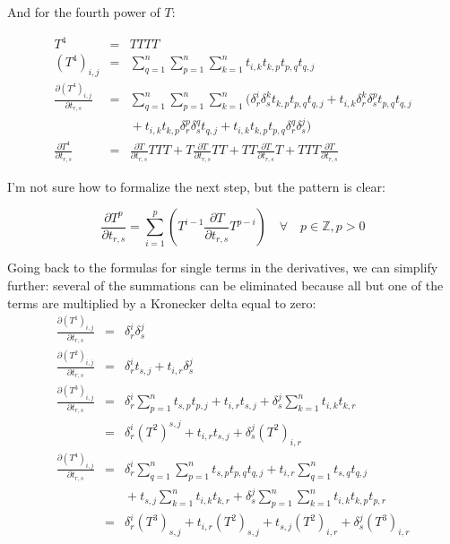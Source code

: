 \documentclass{report}
\begin{document}
And for the fourth power of $T$:

\begin{eqnarray}
T^4 &=& T T T T\\
(T^4)_{i,j} &=& \sum_{q=1}^n \sum_{p=1}^n \sum_{k=1}^n t_{i,k} t_{k,p} t_{p,q} t_{q,j} \\
\nonumber 
\frac{\partial (T^4)_{i,j}}{\partial t_{r,s}} &=& 
  \sum_{q=1}^n \sum_{p=1}^n \sum_{k=1}^n ( 
   \delta^i_r \delta^k_s t_{k,p} t_{p,q} t_{q,j} 
   + t_{i,k} \delta^k_r \delta^p_s t_{p,q} t_{q,j} \\ & & {} 
   + t_{i,k} t_{k,p} \delta^p_r \delta^q_s t_{q,j} 
   + t_{i,k} t_{k,p} t_{p,q} \delta^q_r \delta^j_s)\\
\frac{\partial T^4}{\partial t_{r,s}} &=& 
  \frac{\partial T}{\partial t_{r,s}} T T T 
  + T \frac{\partial T}{\partial t_{r,s}} T T 
  + T T \frac{\partial T}{\partial t_{r,s}} T 
  + T T T \frac{\partial T}{\partial t_{r,s}}
\end{eqnarray}

I'm not sure how to formalize the next step, but the pattern is clear:

\begin{equation}
\frac{\partial T^p}{\partial t_{r,s}}
 = \sum_{i=1}^p\left( T^{i-1} \frac{\partial T}{\partial t_{r,s}} T^{p-i} 
   \right) \quad \forall \quad p \in \mathbb{Z}, p > 0
\end{equation}

Going back to the formulas for single terms in the derivatives, we can simplify further: several of the summations can be eliminated because all but one 
of the terms are multiplied by a Kronecker delta equal to zero:
\begin{eqnarray}
\frac{\partial (T^1)_{i,j}}{\partial t_{r,s}} &=& \delta^i_r \delta^j_s \\
\frac{\partial (T^2)_{i,j}}{\partial t_{r,s}} &=& \delta^i_r t_{s,j} + t_{i,r} \delta^j_s \\
\frac{\partial (T^3)_{i,j}}{\partial t_{r,s}} &=& 
\delta_r^i \sum_{p=1}^n t_{s,p} t_{p,j} + t_{i,r} t_{s,j} + 
\delta_s^j \sum_{k=1}^n t_{i,k} t_{k,r} \\
 & = & \delta_r^i (T^2)^{s,j} + t_{i,r} t_{s,j}
 + \delta_s^j (T^2)_{i,r} \\
\nonumber
\frac{\partial (T^4)_{i,j}}{\partial t_{r,s}} &=& 
\delta^i_r \sum_{q=1}^n \sum_{p=1}^n t_{s,p} t_{p,q} t_{q,j} +
t_{i,r} \sum_{q=1}^n t_{s,q} t_{q,j} \\ & & {} +
t_{s,j} \sum_{k=1}^n t_{i,k} t_{k,r} +
\delta^j_s \sum_{p=1}^n \sum_{k=1}^n t_{i,k} t_{k,p} t_{p,r} \\
 & = & \delta^i_r (T^3)_{s,j} +
t_{i,r} (T^2)_{s,j} + 
t_{s,j} (T^2)_{i,r} +
\delta^j_s (T^3)_{i,r}
\end{eqnarray}
\end{document}
